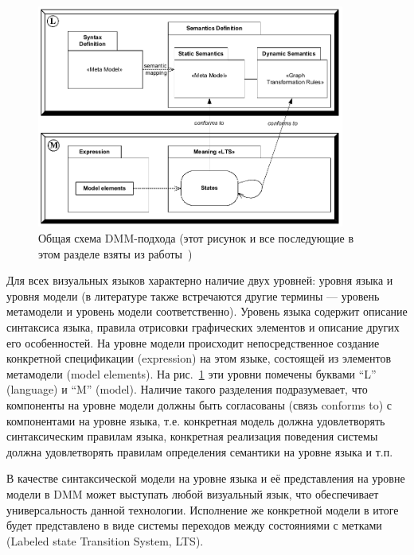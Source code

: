 \documentclass[a5paper]{article}
\begin{document}
\begin{figure} [ht]
  \begin{center}
    \includegraphics[width=0.9\textwidth]{dmm-concept.png}
    \caption{Общая схема DMM-подхода (этот рисунок и все последующие в этом разделе взяты из работы~\cite{dmm2})}
    \label{fig3}
  \end{center}
\end{figure}

Для всех визуальных языков характерно наличие двух уровней: уровня языка и уровня модели (в литературе также встречаются другие термины — уровень метамодели и уровень модели соответственно). Уровень языка содержит описание синтаксиса языка, правила отрисовки графических элементов и описание других его особенностей. На уровне модели происходит непосредственное создание конкретной спецификации (expression) на этом языке, состоящей из элементов метамодели (model elements). На рис.~\ref{fig3} эти уровни помечены буквами “L” (language) и “M” (model). Наличие такого разделения подразумевает, что компоненты на уровне модели должны быть согласованы (связь conforms to) с компонентами на уровне языка, т.е. конкретная модель должна удовлетворять синтаксическим правилам языка, конкретная реализация поведения системы должна удовлетворять правилам определения семантики на уровне языка и т.п.

В качестве синтаксической модели на уровне языка и её представления на уровне модели в DMM может выступать любой визуальный язык, что обеспечивает универсальность данной технологии. Исполнение же конкретной модели в итоге будет представлено в виде системы переходов между состояниями с метками (Labeled state Transition System, LTS).
\end{document}
